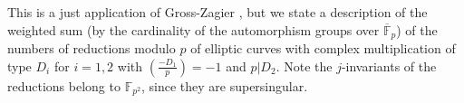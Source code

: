 \documentclass[a4paper, 11pt]{article}
\theoremstyle{plain}
\newtheorem{thm}[defn]{Theorem}
\newcommand{\?}{\textcolor{red}{??}}
\newcommand{\F}{\mathbb{F}}
\newcommand{\cO}{\mathcal{O}}
\newcommand{\ord}{{\operatorname{ord}}}
\newcommand{\Aut}{{\operatorname{Aut}}}
\begin{document}

This is a just application of Gross-Zagier \cite[Thm.\ 1.3 and Lem.\ 3.6]{GZ}, but we state a description of the weighted sum (by the cardinality of the automorphism groups over $\overline{\F}_p$) of the numbers of reductions modulo $p$ of elliptic curves with complex multiplication of type $D_i$ for $i=1,2$ with $\left(\frac{-D_1}{p}\right) = -1$ and $p|D_2$. Note
the $j$-invariants of the reductions belong to ${\F}_{p^2}$,
since they are supersingular.

\end{document}
